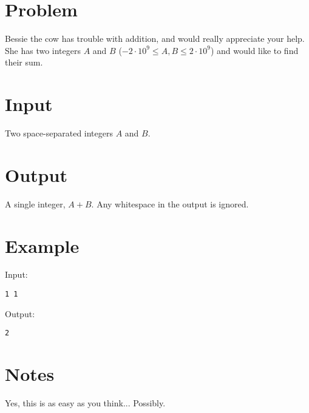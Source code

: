 \documentclass[11pt]{article}
\begin{document}
\section*{Problem}
Bessie the cow has trouble with addition, and would really appreciate your help. She has two integers $A$ and $B$ ($-2\cdot 10^9 \le A, B \le 2\cdot 10^9$) and would like to find their sum.
\section*{Input}
Two space-separated integers $A$ and $B$.
\section*{Output}
A single integer, $A + B$. Any whitespace in the output is ignored.
\section*{Example}
Input:

\begin{verbatim}
1 1
\end{verbatim}

\noindent Output:

\begin{verbatim}
2
\end{verbatim}

\section*{Notes}
Yes, this is as easy as you think... Possibly.
\end{document}
